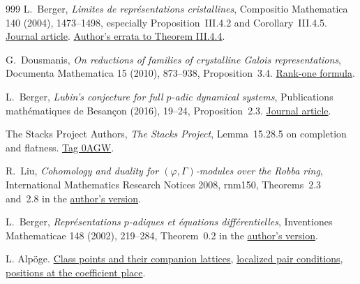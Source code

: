 \documentclass[11pt]{article}
\theoremstyle{definition}
\theoremstyle{plain}
\begin{document}
\begin{thebibliography}{999}
L.~Berger, \emph{Limites de repr\'esentations cristallines},
Compositio Mathematica 140 (2004), 1473--1498, especially
Proposition~III.4.2 and Corollary~III.4.5.
\href{https://doi.org/10.1112/S0010437X04000879}{Journal article}.
\href{https://perso.ens-lyon.fr/laurent.berger/articles/errata.pdf}{Author's errata to Theorem III.4.4}.

G.~Dousmanis, \emph{On reductions of families of crystalline Galois representations},
Documenta Mathematica 15 (2010), 873--938, Proposition~3.4.
\href{https://ems.press/content/serial-article-files/26098\#page=19}{Rank-one formula}.

L.~Berger, \emph{Lubin's conjecture for full $p$-adic dynamical systems},
Publications math\'ematiques de Besan\c{c}on (2016), 19--24,
Proposition~2.3.
\href{https://pmb.centre-mersenne.org/articles/10.5802/pmb.o-2/}{Journal article}.

The Stacks Project Authors, \emph{The Stacks Project},
Lemma~15.28.5 on completion and flatness.
\href{https://stacks.math.columbia.edu/tag/0AGW}{Tag 0AGW}.

R.~Liu, \emph{Cohomology and duality for \((\varphi,\Gamma)\)-modules
over the Robba ring}, International Mathematics Research Notices
2008, rnm150, Theorems~2.3 and~2.8 in the
\href{https://arxiv.org/abs/0711.4346}{author's version}.

L.~Berger, \emph{Repr\'esentations \(p\)-adiques et \'equations
diff\'erentielles}, Inventiones Mathematicae 148 (2002), 219--284,
Theorem~0.2 in the \href{https://arxiv.org/abs/math/0102179}{author's version}.

 L. Alp\"oge.
\href{https://github.com/Deicyde/riemann-hypothesis/blob/a172c464fd4bcfc4f53e394dcba45d742b1409a6/src/Development/AbelianVarietyTheory/Proofs/SatakeParameters/LatticeTupleJointDictionary.lean}{Class points and their companion lattices},
\href{https://github.com/Deicyde/riemann-hypothesis/blob/a172c464fd4bcfc4f53e394dcba45d742b1409a6/src/Development/AbelianVarietyTheory/Proofs/SatakeParameters/KernelSiteLatticeTuplePairsAdmissible.lean}{localized pair conditions},
\href{https://github.com/Deicyde/riemann-hypothesis/blob/a172c464fd4bcfc4f53e394dcba45d742b1409a6/src/Development/AbelianVarietyTheory/Proofs/SatakeParameters/SitePlaceInducesPositionEmbeddings.lean}{positions at the coefficient place}.


\end{thebibliography}
\end{document}
